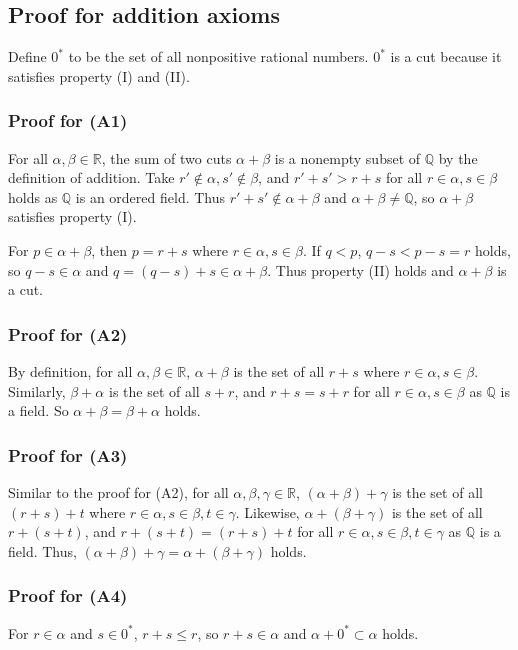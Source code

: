 \documentclass{scrartcl}
\begin{document}
\subsection{Proof for addition axioms}
Define \(0^*\) to be the set of all nonpositive rational numbers.
\(0^*\) is a cut because it satisfies property (I) and (II).

\subsubsection{Proof for (A1)}
For all \(\alpha, \beta \in \mathbb{R}\), the sum of two cuts \(\alpha + \beta\) is a nonempty subset of \(\mathbb{Q}\) by the definition of addition.
Take \(r' \not \in \alpha, s' \not \in \beta\), and \(r' + s' > r + s\) for all \(r \in \alpha, s \in \beta\) holds as \(\mathbb{Q}\) is an ordered field.
Thus \(r' + s' \not \in \alpha + \beta\) and \(\alpha + \beta \not = \mathbb{Q}\), so \(\alpha + \beta\) satisfies property (I).

For \(p \in \alpha + \beta\), then \(p = r + s\) where \(r \in \alpha, s \in \beta\).
If \(q < p\), \(q - s < p - s = r\) holds, so \(q - s \in \alpha\) and \(q = (q - s) + s \in \alpha + \beta\).
Thus property (II) holds and \(\alpha + \beta\) is a cut.

\subsubsection{Proof for (A2)}
By definition, for all \(\alpha, \beta \in \mathbb{R}\), \(\alpha + \beta\) is the set of all \(r + s\) where \(r \in \alpha, s \in \beta\).
Similarly, \(\beta + \alpha\) is the set of all \(s + r\), and \(r + s = s + r\) for all \(r \in \alpha, s \in \beta\)  as \(\mathbb{Q}\) is a field.
So \(\alpha + \beta = \beta + \alpha\) holds.

\subsubsection{Proof for (A3)}
Similar to the proof for (A2), for all \(\alpha, \beta, \gamma \in \mathbb{R}\), \((\alpha + \beta) + \gamma\) is the set of all \((r + s) + t\) where \(r \in \alpha, s \in \beta, t \in \gamma\).
Likewise, \(\alpha + (\beta + \gamma)\) is the set of all \(r + (s + t)\), and \(r + (s + t) = (r + s) + t\) for all \(r \in \alpha, s \in \beta, t \in \gamma\) as \(\mathbb{Q}\) is a field.
Thus, \((\alpha + \beta) + \gamma = \alpha + (\beta + \gamma)\) holds.

\subsubsection{Proof for (A4)}
For \(r \in \alpha\) and \(s \in 0^*\), \(r + s \leq r\), so \(r + s \in \alpha\) and \(\alpha + 0^* \subset \alpha\) holds.
\end{document}
